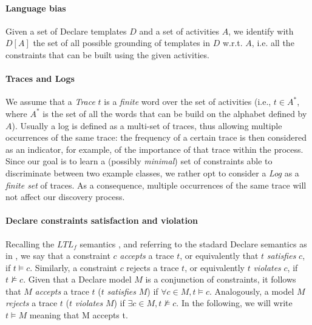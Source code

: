 \paragraph{Language bias} Given a set of Declare templates $D$ and a set of activities $A$, we identify with $D[A]$ the set of all possible grounding of templates in $D$ w.r.t. $A$, i.e. all the constraints that can be built using the given activities.

\paragraph{Traces and Logs} We assume that a \emph{Trace} $t$ is a \emph{finite} word over the set of activities (i.e., $t\in A^*$, where $A^*$ is the set of all the words that can be build on the alphabet defined by $A$).
%
Usually a log is defined as a multi-set of traces, thus allowing multiple occurrences of the same trace: the frequency of a certain trace is then considered as an indicator, for example, of the importance of that trace within the process. Since our goal is to learn a (possibly \emph{minimal}) set of constraints able to discriminate between two example classes, we rather opt to consider a \emph{Log} as a \emph{finite set} of traces. As a consequence, multiple occurrences of the same trace will not affect our discovery process.
%

\paragraph{Declare constraints satisfaction and violation} Recalling the $LTL_f$ semantics \cite{DBLP:journals/tweb/MontaliPACMS10,DBLP:conf/ijcai/GiacomoV13}, and referring to the stadard Declare semantics as in \cite{2008-Pesic}, we say that a constraint $c$ \emph{accepts} a trace $t$, or equivalently that $t$ \emph{satisfies} $c$, if $t \models c$. Similarly, a constraint $c$ rejects a trace $t$, or equivalently $t$ \emph{violates} $c$, if $t \not\models c$. Given that a Declare model $M$ is a conjunction of constraints, it follows that $M$ \emph{accepts} a trace $t$ ($t$ \emph{satisfies} $M$) if $\forall c \in M, t \models c$. Analogously, a model $M$ \emph{rejects} a trace $t$ ($t$ \emph{violates} $M$) if $\exists c \in M, t\not\models c$. In the following, we will write $t \models M$ meaning that M accepts t.


